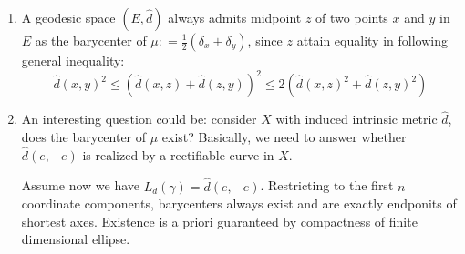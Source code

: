 \begin{rmk}
\begin{enumerate}
		\item A geodesic space $(E, \hat{d})$ always admits midpoint $z$ of two points $x$ and $y$ in $E$ as the barycenter of $\mu : = \frac{1}{2} (\delta_x + \delta_y)$, since $z$ attain equality in following general inequality:
		      \[
			      \hat{d}(x,y)^2 \leq \left(\hat{d}(x,z) + \hat{d}(z,y)\right)^2 \leq 2\left(\hat{d}(x,z)^2+ \hat{d}(z,y)^2\right)
		      \]
		\item An interesting question could be: consider $X$ with induced intrinsic metric $\hat{d}$, does the barycenter of $\mu$ exist?
		      Basically, we need to answer whether $\hat{d}(e,-e)$ is realized by a rectifiable curve in $X$.

		      Assume now we have $L_{d}(\gamma)=\hat{d}(e,-e)$.
		      Restricting to the first $n$ coordinate components, barycenters always exist and are exactly endponits of shortest axes. Existence is a priori guaranteed by compactness of finite dimensional ellipse.


\end{enumerate}
\end{rmk}
